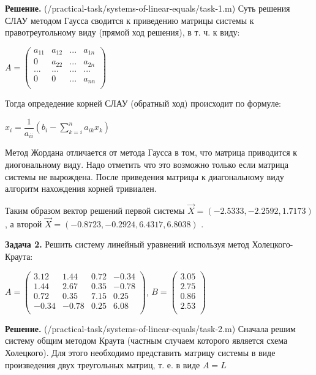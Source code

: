 \documentclass[a4paper, 12pt]{article}
\begin{document}
    \quad \textbf{Решение.} (/practical-task/systems-of-linear-equals/task-1.m) Суть решения СЛАУ методом Гаусса сводится к приведению матрицы системы к правотреугольному виду (прямой ход решения), в т. ч. к виду:
    
    \begin{center}
        $ A = \left(
            \begin{array}{cccc}
                a_{11} & a_{12} & ... & a_{1n} \\
                0 & a_{22} & ... & a_{2n} \\
                ... & ... & ... & ... \\
                0 & 0 & ... & a_{nn} \\    
            \end{array}
        \right)$
    \end{center}

    \quad Тогда опредедение корней СЛАУ (обратный ход) происходит по формуле: 

    \begin{center}
        $x_i = \dfrac{1}{a_{i i}} (b_i - \displaystyle\sum\limits_{k=i}^{n} a_{ik} x_k) $
    \end{center}

    \quad Метод Жордана отличается от метода Гаусса в том, что матрица приводится к диогональному виду. 
    Надо отметить что это возможно только если матрица системы не вырождена. После приведения матрицы к диагональному виду алгоритм нахождения корней тривиален.  

    \quad Таким образом вектор решений первой системы $\vec{X} = (-2.5333, -2.2592, 1.7173)$, а второй $\vec{X} = (-0.8723, -0.2924, 6.4317, 6.8038)$ .

    \quad \textbf{Задача 2.} Решить систему линейный уравнений используя метод Холецкого-Краута:

    \begin{center}
        $A = \left(
            \begin{array}{cccc}
                3.12 & 1.44 & 0.72 & -0.34 \\
                1.44 & 2.67 & 0.35 & -0.78 \\
                0.72 & 0.35 & 7.15 & 0.25 \\
                -0.34 & -0.78 & 0.25 & 6.08 \\
            \end{array}
        \right)$, $B = \left(
            \begin{array}{ccc}
                3.05 \\
                2.75 \\ 
                0.86 \\
                2.53 \\
            \end{array}
        \right)$
    \end{center}

    \quad \textbf{Решение.} (/practical-task/systems-of-linear-equals/task-2.m) Сначала решим систему общим методом Краута (частным случаем которого является схема Холецкого).
    Для этого необходимо представить матрицу системы в виде произведения двух треугольных матриц, т. е. в виде $ A = L$
\end{document}

